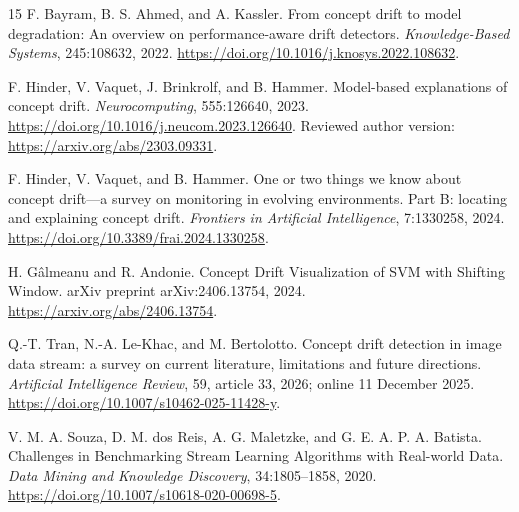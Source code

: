 \documentclass[10pt,a4paper]{article}
\begin{document}
\begin{thebibliography}{15}
F. Bayram, B. S. Ahmed, and A. Kassler.
From concept drift to model degradation: An overview on performance-aware drift detectors.
\emph{Knowledge-Based Systems}, 245:108632, 2022.
\url{https://doi.org/10.1016/j.knosys.2022.108632}.


F. Hinder, V. Vaquet, J. Brinkrolf, and B. Hammer.
Model-based explanations of concept drift.
\emph{Neurocomputing}, 555:126640, 2023.
\url{https://doi.org/10.1016/j.neucom.2023.126640}.
Reviewed author version: \url{https://arxiv.org/abs/2303.09331}.

F. Hinder, V. Vaquet, and B. Hammer.
One or two things we know about concept drift---a survey on monitoring in evolving environments.
Part B: locating and explaining concept drift.
\emph{Frontiers in Artificial Intelligence}, 7:1330258, 2024.
\url{https://doi.org/10.3389/frai.2024.1330258}.

H. G\^almeanu and R. Andonie.
Concept Drift Visualization of SVM with Shifting Window.
arXiv preprint arXiv:2406.13754, 2024.
\url{https://arxiv.org/abs/2406.13754}.

Q.-T. Tran, N.-A. Le-Khac, and M. Bertolotto.
Concept drift detection in image data stream: a survey on current literature, limitations and future directions.
\emph{Artificial Intelligence Review}, 59, article 33, 2026; online 11 December 2025.
\url{https://doi.org/10.1007/s10462-025-11428-y}.

V. M. A. Souza, D. M. dos Reis, A. G. Maletzke, and G. E. A. P. A. Batista.
Challenges in Benchmarking Stream Learning Algorithms with Real-world Data.
\emph{Data Mining and Knowledge Discovery}, 34:1805--1858, 2020.
\url{https://doi.org/10.1007/s10618-020-00698-5}.

\end{thebibliography}
\end{document}
